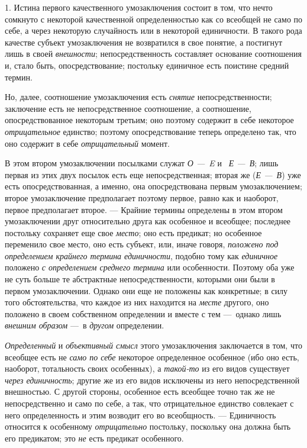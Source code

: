\documentclass[twoside]{article}
\begin{document}
{{{{{1. Истина первого качественного умозаключения состоит в том,
что нечто сомкнуто с некоторой качественной определенностью как со всеобщей
не само по себе, а через некоторую случайность или в некоторой единичности.
В такого рода качестве субъект умозаключения не возвратился в свое понятие,
а постигнут лишь в своей
{\em внешности};
непосредственность составляет основание соотношения и, стало
быть, опосредствование; постольку единичное есть поистине средний термин.

Но, далее, соотношение умозаключения есть
{\em снятие}
непосредственности; заключение есть не непосредственное
соотношение, а соотношение, опосредствованное некоторым третьим; оно
поэтому содержит в себе некоторое
{\em отрицательное}
единство; поэтому опосредствование теперь определено так, что
оно содержит в себе {\em отрицательный}
момент.

В этом втором умозаключении посылками служат
{\em О —~E} и
~{\em Е —~В};
лишь первая из этих двух посылок есть еще непосредственная;
вторая же ({\em Е —~В})
уже есть опосредствованная, а именно, она опосредствована
первым умозаключением; второе умозаключение предполагает поэтому первое,
равно как и наоборот, первое предполагает второе. — Крайние
термины определены в этом втором умозаключении друг относительно друга как
особенное и всеобщее; последнее постольку сохраняет еще свое
{\em место}; оно есть
предикат; но особенное переменило свое место, оно есть субъект, или, иначе
говоря, {\em положено под определением
крайнего термина единичности}, подобно тому как
{\em единичное} положено
{\em с определением среднего термина}
или особенности. Поэтому оба уже не суть больше те
абстрактные непосредственности, которыми они были в первом умозаключении.
Однако они еще не положены как конкретные; в силу того обстоятельства, что
каждое из них находится на {\em месте}
другого, оно положено в своем собственном определении и
вместе с тем —~однако лишь
{\em внешним образом} —~в
{\em другом}
определении.

{\em Определенный} и
{\em объективный смысл}
этого умозаключения заключается в том, что всеобщее есть не
{\em само по себе}
некоторое определенное особенное (ибо оно есть, наоборот,
тотальность своих особенных), а
{\em такой-то} из его
видов существует {\em через
единичность}; другие же из его видов исключены из него
непосредственной внешностью. С другой стороны, особенное есть всеобщее
точно так же не непосредственно и само по себе, а так, что отрицательное
единство совлекает с него определенность и этим возводит его во
всеобщность. — Единичность относится к особенному
{\em отрицательно}
постольку, поскольку она должна быть его предикатом; это
{\em не} есть предикат
особенного.

}}}}}
\end{document}

